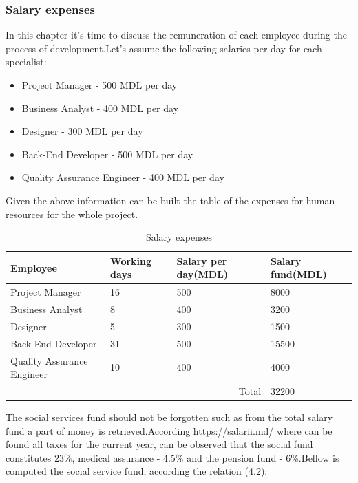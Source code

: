 \subsubsection{Salary expenses}
In this chapter it's time to discuss the remuneration of each employee during the process of development.Let's assume the following salaries per day for each specialist:
\begin{itemize}
	\item Project Manager - 500 MDL per day
	\item Business Analyst - 400 MDL per day
	\item Designer - 300 MDL per day
	\item Back-End Developer - 500 MDL per day
	\item Quality Assurance Engineer - 400 MDL per day
\end{itemize}
Given the above information can be built the table of the expenses for human resources for the whole project.
\begin{table}[H]
	\centering
	\caption{Salary expenses}
	\label{Salary expenses}
	\begin{tabular}{|l|l|l|l|}
		\hline
		\textbf{Employee}          & \textbf{Working days} & \textbf{Salary per day(MDL)} & \textbf{Salary fund(MDL)} \\ \hline
		Project Manager            & 16                    & 500                          & 8000                      \\ \hline
		Business Analyst           & 8                     & 400                          & 3200                      \\ \hline
		Designer                   & 5                     & 300                          & 1500                      \\ \hline
		Back-End Developer         & 31                    & 500                          & 15500                     \\ \hline
		Quality Assurance Engineer & 10                    & 400                          & 4000                      \\ \hline
		\multicolumn{3}{|r|}{Total}                                                       & 32200                     \\ \hline
	\end{tabular}
\end{table}
The social services fund should not be forgotten such as from the total salary fund a part of money is retrieved.According \url{https://salarii.md/} where can be found all taxes for the current year, can be observed that the social fund constitutes 23\%, medical assurance - 4.5\% and the pension fund - 6\%.Bellow is computed the social service fund, according the relation (4.2):
\begin{equation}
	
\end{equation}
